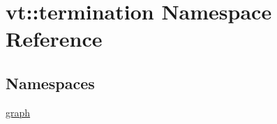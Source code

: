 \hypertarget{namespacevt_1_1termination}{}\section{vt\+:\+:termination Namespace Reference}
\label{namespacevt_1_1termination}
\subsection*{Namespaces}
\begin{DoxyCompactItemize}
\item 
 \hyperlink{namespacevt_1_1termination_1_1graph}{graph}
\end{DoxyCompactItemize}
